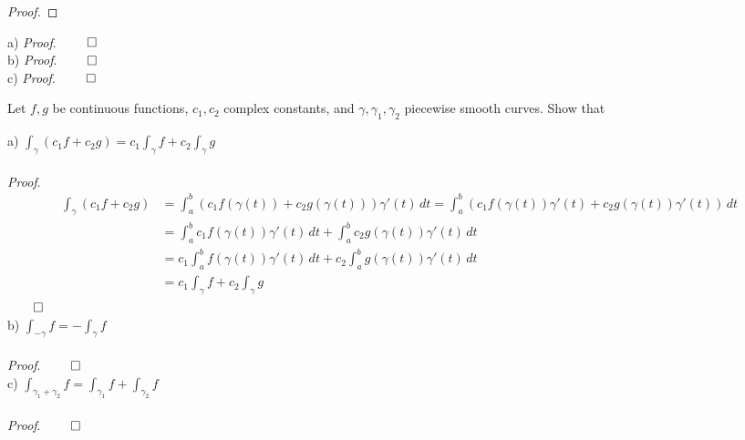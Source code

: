 \documentclass[12pt]{article}
\newenvironment{exercise}[2][Exercise]{\begin{trivlist}
\item[\hskip \labelsep {\bfseries #1}\hskip \labelsep {\bfseries #2.}]}{\end{trivlist}}
\begin{document}
\begin{proof}

\end{proof}

\begin{exercise}{4} 
\end{exercise}
 
\noindent a) {\em Proof}.
$\hfill \qed$ \\

\noindent b) {\em Proof}.
$\hfill \qed$ \\

\noindent c) {\em Proof}.
$\hfill \qed$ 

\begin{exercise}{5} Let $f,g$ be continuous functions, $c_1,c_2$ complex constants, and $\gamma,\gamma_1,\gamma_2$ piecewise smooth curves. Show that
\end{exercise}
 
\noindent a) $\int_{\gamma} (c_1f+c_2g) = c_1\int_{\gamma} f + c_2\int_{\gamma} g$ \\ \\
{\em Proof}.
\begin{align*}
\int_{\gamma} (c_1f+c_2g) &= \int_a^b (c_1f(\gamma(t)) + c_2g(\gamma(t))) \gamma'(t) \, dt = \int_a^b (c_1f(\gamma(t)) \gamma'(t) + c_2g(\gamma(t)) \gamma'(t) ) \, dt \\ 
&= \int_a^b c_1f(\gamma(t)) \gamma'(t) \, dt + \int_a^b c_2g(\gamma(t)) \gamma'(t) \, dt \\ &= c_1 \int_a^b f(\gamma(t)) \gamma'(t) \, dt + c_2 \int_a^b g(\gamma(t)) \gamma'(t) \, dt \\
&= c_1\int_{\gamma} f + c_2\int_{\gamma} g
\end{align*}
$\hfill \qed$ \\

\noindent b) $\int_{-\gamma} f = -\int_{\gamma} f$ \\ \\
{\em Proof}.
$\hfill \qed$ \\

\noindent c) $\int_{\gamma_1 + \gamma_2} f = \int_{\gamma_1} f + \int_{\gamma_2} f$ \\ \\ 
{\em Proof}.
$\hfill \qed$ 
\end{document}
